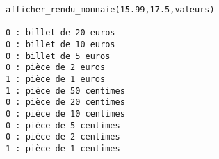 \begin{center}
\begin{lstlisting}
afficher_rendu_monnaie(15.99,17.5,valeurs)

0 : billet de 20 euros
0 : billet de 10 euros
0 : billet de 5 euros
0 : pièce de 2 euros
1 : pièce de 1 euros
1 : pièce de 50 centimes
0 : pièce de 20 centimes
0 : pièce de 10 centimes
0 : pièce de 5 centimes
0 : pièce de 2 centimes
1 : pièce de 1 centimes
\end{lstlisting}
\end{center}



%
%
